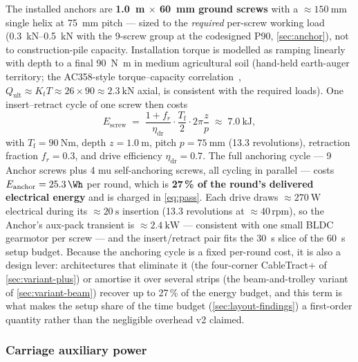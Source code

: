 \documentclass[11pt,a4paper]{article}
\begin{document}
The installed anchors are \textbf{\SI{1.0}{\meter} $\times$ \SI{60}{\milli\meter} ground screws} with a ${\approx}\SI{150}{\milli\meter}$ single helix at \SI{75}{\milli\meter} pitch --- sized to the \emph{required} per-screw working load (\SIrange{0.3}{0.5}{\kilo\newton} with the 9-screw group at the codesigned P90, \cref{sec:anchor}), not to construction-pile capacity. Installation torque is modelled as ramping linearly with depth to a final \SI{90}{\newton\meter} in medium agricultural soil (hand-held earth-auger territory; the AC358-style torque--capacity correlation~\cite{ac358,perko2009helical}, $Q_{\text{ult}} \approx K_t T \approx 26 \times 90 \approx \SI{2.3}{\kilo\newton}$ axial, is consistent with the required loads). One insert--retract cycle of one screw then costs
\begin{equation}\label{eq:anchor-energy}
E_{\text{screw}} \;=\; \frac{1+f_r}{\eta_{\text{dr}}}\cdot \frac{T_{\text{f}}}{2}\cdot 2\pi \frac{z}{p} \;\approx\; \SI{7.0}{\kilo\joule},
\end{equation}
with $T_{\text{f}} = \SI{90}{\newton\meter}$, depth $z = \SI{1.0}{\meter}$, pitch $p = \SI{75}{\milli\meter}$ (13.3 revolutions), retraction fraction $f_r = 0.3$, and drive efficiency $\eta_{\text{dr}} = 0.7$. The full anchoring cycle --- 9 Anchor screws plus 4 \gls{mu} self-anchoring screws, all cycling in parallel --- costs $E_{\text{anchor}} = \SI{25.3}{\Wh}$ per round, which is \textbf{27\,\% of the round's delivered electrical energy} and is charged in \cref{eq:pass}. Each drive draws ${\approx}\SI{270}{\watt}$ electrical during its ${\approx}\SI{20}{\second}$ insertion (13.3 revolutions at ${\approx}40$\,rpm), so the Anchor's aux-pack transient is ${\approx}\SI{2.4}{\kilo\watt}$ --- consistent with one small BLDC gearmotor per screw --- and the insert/retract pair fits the \SI{30}{\second} slice of the \SI{60}{\second} setup budget. Because the anchoring cycle is a fixed per-round cost, it is also a design lever: architectures that eliminate it (the four-corner CableTract+ of \cref{sec:variant-plus}) or amortise it over several strips (the beam-and-trolley variant of \cref{sec:variant-beam}) recover up to 27\,\% of the energy budget, and this term is what makes the setup share of the time budget (\cref{sec:layout-findings}) a first-order quantity rather than the negligible overhead v2 claimed.

\subsubsection{Carriage auxiliary power}\label{sec:carriage-power}
\end{document}
